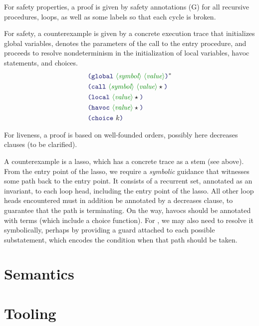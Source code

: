 \documentclass[runningheads]{llncs}
\begin{document}
For safety properties, a proof is given by safety annotations (G)
for all recursive procedures, loops, as well as some labels so that each cycle is broken.

For safety, a counterexample is given by a concrete execution trace
that initializes global variables, denotes the parameters
of the call to the entry procedure,
and proceeds to resolve nondeterminism in the initialization of local variables,
havoc statements, and choices.
\begin{align*}
& \LP \terminal{global}~ \nonterminal{symbol}~\nonterminal{value} \RP\rstar \\
& \LP \terminal{call}~   \nonterminal{symbol}~\nonterminal{value}\star \RP \\
& \LP \terminal{local}~ \nonterminal{value}\star \RP \\
& \LP \terminal{havoc}~ \nonterminal{value}\star \RP \\
& \LP \terminal{choice}~  k \RP \\
\end{align*}

For liveness, a proof is based on well-founded orders,
possibly here decreases clauses (to be clarified).

A counterexample is a lasso,
which has a concrete trace as a stem (see above).
From the entry point of the lasso,
we require a \emph{symbolic} guidance that witnesses some path
back to the entry point.
It consists of a recurrent set, annotated as an invariant,
to each loop head, including the entry point of the lasso.
All other loop heads encountered must in addition be annotated
by a decreases clause, to guarantee that the path is terminating.
On the way, havocs should be annotated with terms
(which include a choice function).
For , we may also need to resolve it symbolically,
perhaps by providing a guard attached to each possible substatement,
which encodes the condition when that path should be taken.

\section{Semantics}

\section{Tooling}
\end{document}
